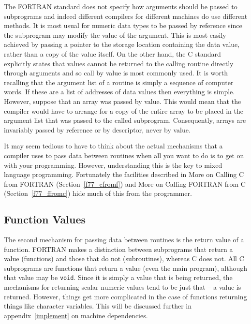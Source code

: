 \documentclass[twoside,11pt]{article}
\newcommand{\htmlref}[2]{#1}
\newcommand{\latex}[1]{#1}
\newcommand{\xlabel}[1]{}
\renewcommand{\_}{\texttt{\symbol{95}}}
\begin{document}
The FORTRAN standard does not specify how arguments should be passed to
subprograms and indeed different compilers for different machines do use
different methods. It is most usual for numeric data types to be passed by
reference since the subprogram may modify the value of the argument. This is
most easily achieved by passing a pointer to the storage location containing
the data value, rather than a copy of the value itself. On the other hand, the
C standard explicitly states that values cannot be returned to the calling
routine directly through arguments and so call by value is most commonly used.
It is worth recalling that the argument list of a routine is simply a sequence
of computer words. If these are a list of addresses of data values then
everything is simple. However, suppose that an array was passed by value. This
would mean that the compiler would have to arrange for a copy of the entire
array to be placed in the argument list that was passed to the called
subprogram. Consequently, arrays are invariably passed by reference or by
descriptor, never by value.

It may seem tedious to have to think about the actual mechanisms that a
compiler uses to pass data between routines when all you want to do is to get
on with your programming. However, understanding this is the key to mixed
language programming. Fortunately the facilities described in
\htmlref{More on Calling C from FORTRAN}{f77_cfromf}
\latex{(Section~\ref{f77_cfromf})} and
\htmlref{More on Calling FORTRAN from C}{f77_ffromc}
\latex{(Section~\ref{f77_ffromc})} hide much of this from the programmer. 

\subsection{\xlabel{function_values}Function Values}

The second mechanism for passing data between routines is the return value of a
function. FORTRAN makes a distinction between subprograms that return a value
(functions) and those that do not (subroutines), whereas C does not. All C
subprograms are functions that return a value (even the main program), although
that value may be \texttt{void}. Since it is simply a value that is being
returned, the mechanisms for returning scalar numeric values tend to be just
that -- a value is returned. 
However, things get more complicated in the case of
functions returning things like character variables. This will be discussed
further in \latex{appendix~\ref{implement} on}
\htmlref{machine dependencies.}{implement}
\end{document}
